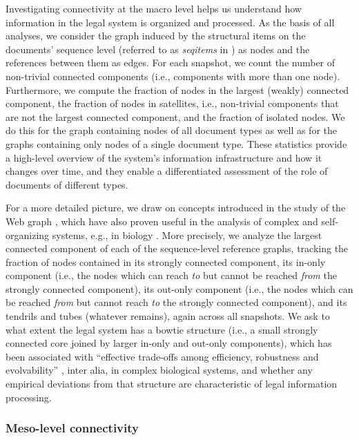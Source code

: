 Investigating connectivity at the macro level helps us understand how information in the legal system is organized and processed. 
As the basis of all analyses, we consider the graph induced by the structural items on the documents' sequence level (referred to as \emph{seqitems} in \cite{katz2020}) as nodes and the references between them as edges. 
For each snapshot, we count the number of non-trivial connected components (i.e., components with more than one node). 
Furthermore, we compute the fraction of nodes in the largest (weakly) connected component, 
the fraction of nodes in satellites, i.e., non-trivial components that are not the largest connected component, 
and the fraction of isolated nodes. 
We do this for the graph containing nodes of all document types as well as for the graphs containing only nodes of a single document type. 
These statistics provide a high-level overview of the system's information infrastructure and how it changes over time, 
and they enable a differentiated assessment of the role of documents of different types. 

For a more detailed picture, we draw on concepts introduced in the study of the Web graph \cite{broder2000}, which have also proven useful in the analysis of complex and self-organizing systems, e.g., in biology \cite{friedlander2015,csete2004,ma2003}. 
More precisely, we analyze the largest connected component of each of the sequence-level reference graphs, 
tracking the fraction of nodes contained in its strongly connected component, its in-only component (i.e., the nodes which can reach \emph{to} but cannot be reached \emph{from} the strongly connected component), its out-only component (i.e., the nodes which can be reached \emph{from} but cannot reach \emph{to} the strongly connected component), and its tendrils and tubes (whatever remains), 
again across all snapshots.
We ask to what extent the legal system has a bowtie structure (i.e., a small strongly connected core joined by larger in-only and out-only components), which has been associated with ``effective trade-offs among efficiency, robustness and evolvability'' \cite{csete2004}, inter alia, in complex biological systems, and whether any empirical deviations from that structure are characteristic of legal information processing.

\vspace*{12pt}
\subsubsection{Meso-level connectivity}
\label{subsubsec:methods:connectivity:meso}

